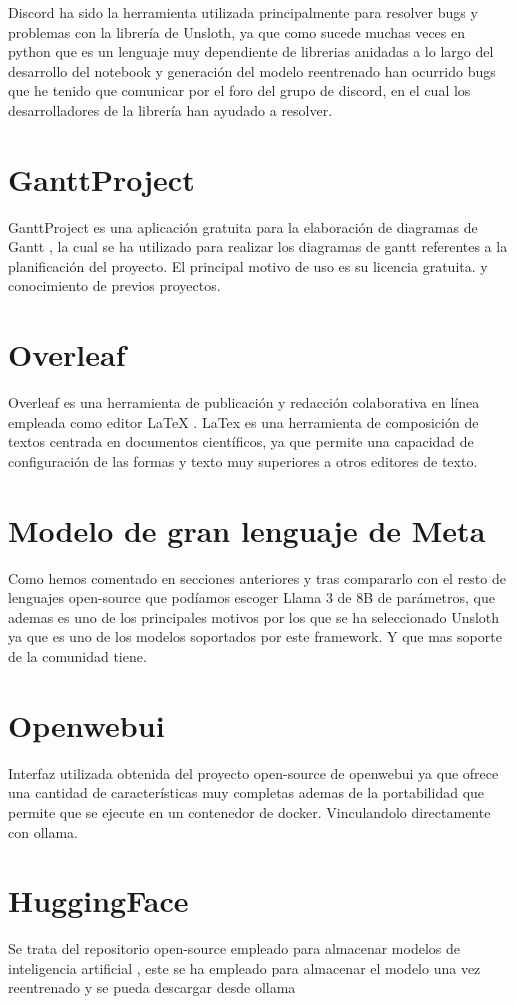 Discord ha sido la herramienta utilizada principalmente para resolver bugs y problemas con la librería de Unsloth\cite{Unsloth}, ya que como sucede muchas veces en python que es un lenguaje muy dependiente de librerias anidadas a lo largo del desarrollo del notebook y generación del modelo reentrenado han ocurrido bugs que he tenido que comunicar por el foro del grupo de discord, en el cual los desarrolladores de la librería han ayudado a resolver.

\section{GanttProject}
GanttProject es una aplicación gratuita para la elaboración de diagramas de Gantt \cite{ganttProyect}, la cual se ha utilizado para realizar los diagramas de gantt referentes a la planificación del proyecto. El principal motivo de uso es su licencia gratuita. y conocimiento de previos proyectos.

\section{Overleaf}

Overleaf es una herramienta de publicación y redacción colaborativa en línea empleada como editor LaTeX \cite{overleaf}. LaTex es una herramienta de composición de textos centrada en documentos científicos, ya que permite una capacidad de configuración de las formas y texto muy superiores a otros editores de texto.

\section {Modelo de gran lenguaje de Meta}

Como hemos comentado en secciones anteriores y tras compararlo con el resto de lenguajes open-source que podíamos escoger Llama 3 de 8B \cite{llama} de parámetros, que ademas es uno de los principales motivos por los que se ha seleccionado Unsloth ya que es uno de los modelos soportados por este framework. Y que mas soporte de la comunidad tiene.

\section {Openwebui}

Interfaz utilizada obtenida del proyecto open-source de openwebui\cite{openwebui} ya que ofrece una cantidad de características muy completas ademas de la portabilidad que permite que se ejecute en un contenedor de docker. Vinculandolo directamente con ollama.

\section{HuggingFace}

Se trata del repositorio open-source empleado para almacenar modelos de inteligencia artificial \cite{HuggingFace}, este se ha empleado para almacenar el modelo una vez reentrenado y se pueda descargar desde ollama \cite{Ollama}



